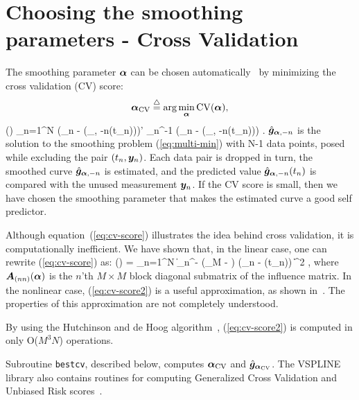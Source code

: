 \section{Choosing the smoothing parameters - Cross Validation}
\label{sec:auto}

The smoothing parameter
$\bm{\alpha}$
can be chosen automatically~\cite{Fessler:91:lin}
by minimizing the 
cross validation (CV) score:
\[
\bm{\alpha}_{{\rm CV}} \stackrel{\bigtriangleup}{=} \arg \min_{\bm{\alpha}} {\rm CV}(\bm{\alpha}),
\]
\be
\CV(\balpha)  {} \sum_{n=1}^N 
(\meas_n - \mfun(\hat{\g}_{\balpha, -n}(t_n)))' \mcov_n^{-1}
(\meas_n - \mfun(\hat{\g}_{\balpha, -n}(t_n)))
.
$\hat{\bm{g}}_{\bm{\alpha}, -n}$
is the solution to the smoothing problem (\ref{eq:multi-min})
with N-1 data points,
posed
while excluding
the pair $(t_n, \bm{y}_n)$.
Each data pair is dropped in turn,
the smoothed curve $\hat{\bm{g}}_{\bm{\alpha},-n}$ is estimated,
and the predicted value $\hat{\bm{g}}_{\bm{\alpha},-n}(t_n)$
is compared with the unused measurement $\bm{y}_n$.
If the CV score is small,
then we have
chosen the smoothing parameter
that makes
the estimated curve a good self predictor.

Although equation~(\ref{eq:cv-score})
illustrates the idea behind cross validation,
it is computationally inefficient.
We have shown that,
in the linear case,
one can rewrite (\ref{eq:cv-score})
as:
\be
\CV(\balpha) =  \sum_{n=1}^N
\| \mcov_n^{-} (\I_M - )\inv
	(\meas_n - \bghata(t_n)) \|^2
,
where $\bm{A}_{(nn)}(\bm{\alpha})$ is the $n$'th $M \times M$
block diagonal submatrix of the influence matrix.
In the nonlinear case,
(\ref{eq:cv-score2}) is a useful approximation,
as shown in~\cite{Fessler:91:non}.
The properties of this approximation
are not completely understood.

By using the Hutchinson and de Hoog algorithm~\cite{HutchHoog:85},
(\ref{eq:cv-score2}) is computed
in only O($M^3N$) operations.

Subroutine
{\tt bestcv},
described below,
computes
$\bm{\alpha}_{{\rm CV}}$
and
$\hat{\bm{g}}_{\bm{\alpha}_{{\rm CV}}}$.
The VSPLINE library also
contains routines for computing
Generalized Cross Validation
and Unbiased Risk scores~\cite{Fessler:91:lin}.
